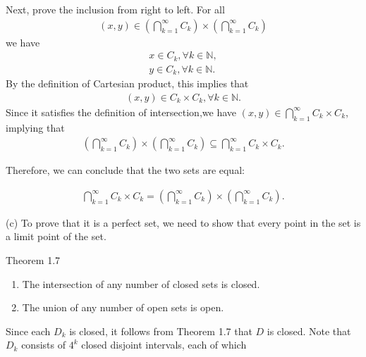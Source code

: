 \documentclass[UTF8,a4paper,10pt]{article}
\begin{document}
\begin{solution}
    Next, prove the inclusion from right to left. For all
    \begin{equation*}
      \begin{aligned}
          (x,y)\in \left(\bigcap_{k=1}^{\infty} C_k\right) \times \left(\bigcap_{k=1}^{\infty} C_k\right)
      \end{aligned}
    \end{equation*}
    we have
    \begin{equation*}
      \begin{aligned}
        x\in C_k, \forall k \in \mathbb{N},\\
        y\in C_k, \forall k \in \mathbb{N}.
      \end{aligned}
    \end{equation*}
    By the definition of Cartesian product, this implies that
    \begin{equation*}
      \begin{aligned}
        (x,y)\in C_k \times C_k, \forall k \in \mathbb{N}.
      \end{aligned}
    \end{equation*}
    Since it satisfies the definition of intersection,we have \((x,y)\in \bigcap_{k=1}^{\infty} C_k \times C_k \), implying that 
    \begin{equation*}
      \begin{aligned}
        \left(\bigcap_{k=1}^{\infty} C_k\right) \times \left(\bigcap_{k=1}^{\infty} C_k\right) \subseteq \bigcap_{k=1}^{\infty} C_k \times C_k .
      \end{aligned}
    \end{equation*}
    


    Therefore, we can conclude that the two sets are equal:

    \begin{equation*}
      \begin{aligned}
        \bigcap_{k=1}^{\infty} C_k \times C_k =  \left(\bigcap_{k=1}^{\infty} C_k\right) \times \left(\bigcap_{k=1}^{\infty} C_k\right) .
      \end{aligned}
    \end{equation*}

    (c) To prove that it is a perfect set, we need to show that every point in the set is a limit point of the set.
    \begin{mybox}{Theorem 1.7}
      \begin{enumerate}[label=(\roman*)]
        \item The intersection of any number of closed sets is closed.
        \item The union of any number of open sets is open.
      \end{enumerate}
    \end{mybox}
    Since each \(D_k\) is closed, it follows from Theorem 1.7 that \(D\) is closed. Note that \(D_k\) consists of \(4^k\) closed disjoint intervals, each of which 



 

  \end{solution}
  
\end{document}
